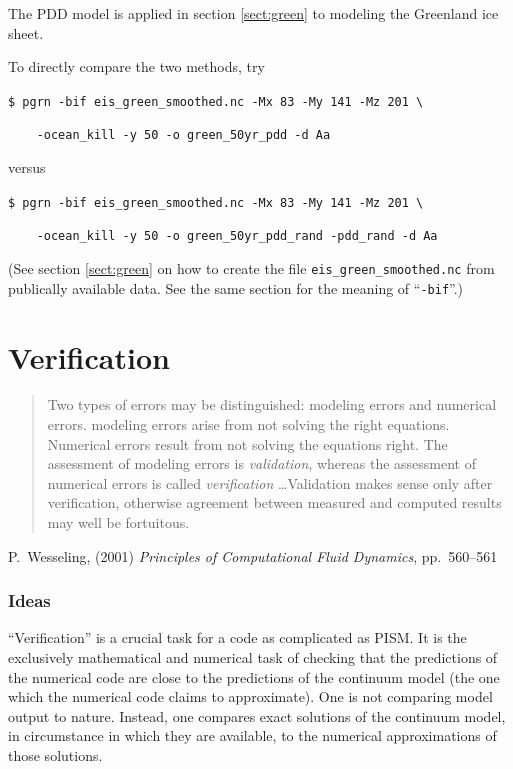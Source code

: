 \documentclass[11pt,final]{amsart}
\begin{document}
The PDD model is applied in section \ref{sect:green} to modeling the Greenland ice sheet.  

To directly compare the two methods, try

\verb|$ pgrn -bif eis_green_smoothed.nc -Mx 83 -My 141 -Mz 201 \|

\verb|    -ocean_kill -y 50 -o green_50yr_pdd -d Aa|

\noindent versus

\verb|$ pgrn -bif eis_green_smoothed.nc -Mx 83 -My 141 -Mz 201 \|

\verb|    -ocean_kill -y 50 -o green_50yr_pdd_rand -pdd_rand -d Aa|

\noindent (See section \ref{sect:green} on how to create the file \verb|eis_green_smoothed.nc| from publically available data.  See the same section for the meaning of ``\verb|-bif|''.)



\clearpage\newpage
\section{Verification}\label{sect:verif}

\bigskip
\begin{quote}  Two types of errors may be distinguished: modeling errors and numerical errors.  modeling errors arise from not solving the right equations.  Numerical errors result from not solving the equations right.  The assessment of modeling errors is \emph{validation}, whereas the assessment of numerical errors is called \emph{verification} \dots  Validation makes sense only after verification, otherwise agreement between measured and computed results may well be fortuitous.
\end{quote}
\hfill P.~Wesseling, (2001)  \emph{Principles of Computational Fluid Dynamics}, pp.~560--561 \cite{Wesseling}
\bigskip

\subsubsection*{Ideas} ``Verification'' is a crucial task for a code as complicated as PISM.  It is the exclusively mathematical and numerical task of checking that the predictions of the numerical code are close to the predictions of the continuum model (the one which the numerical code claims to approximate).  One is not comparing model output to nature.  Instead, one compares exact solutions of the continuum model, in circumstance in which they are available, to the numerical approximations of those solutions.
\end{document}
